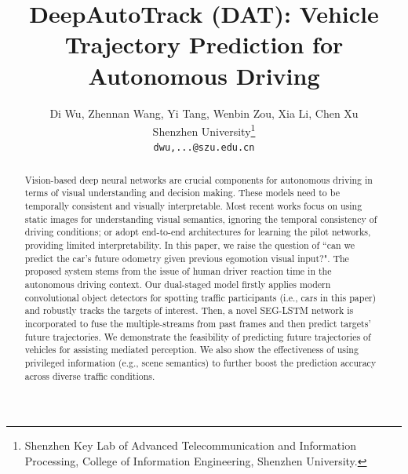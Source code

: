 \documentclass[10pt,twocolumn,letterpaper]{article}
\begin{document}
\title{DeepAutoTrack (DAT): Vehicle Trajectory Prediction for Autonomous Driving}

\author{Di Wu, Zhennan Wang, Yi Tang,  Wenbin Zou, Xia Li, Chen Xu\\
Shenzhen University\thanks{Shenzhen Key Lab of Advanced Telecommunication and Information Processing, College of Information Engineering, Shenzhen University.}\\
{\tt\small dwu,...@szu.edu.cn}}
\maketitle
\begin{abstract}

Vision-based deep neural networks are crucial components for autonomous driving in terms of visual understanding and decision making.
These models need to be temporally consistent and visually interpretable.
Most recent works focus on using static images for understanding visual semantics, ignoring the temporal consistency of driving conditions; or adopt end-to-end architectures for learning the pilot networks, providing limited interpretability.
In this paper, we raise the question of ``can we predict the car's future odometry given previous egomotion visual input?".
The proposed system stems from the issue of human driver reaction time in the autonomous driving context.
Our dual-staged model firstly applies modern convolutional object detectors for spotting traffic participants (i.e., cars in this paper) and robustly tracks the targets of interest.
Then, a novel SEG-LSTM network is incorporated to fuse the multiple-streams from past frames and then predict targets' future trajectories.
We demonstrate the feasibility of predicting future trajectories of vehicles for assisting mediated perception.
 We also show the effectiveness of using privileged information (e.g., scene semantics) to further boost the prediction accuracy across diverse traffic conditions.
\end{abstract}
\end{document}
